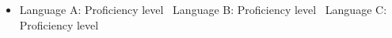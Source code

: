 \begin{itemize}[parsep=0.5ex]
  \item Language A: Proficiency level \textbar\ Language B: Proficiency level \textbar\ Language C: Proficiency level
\end{itemize}
